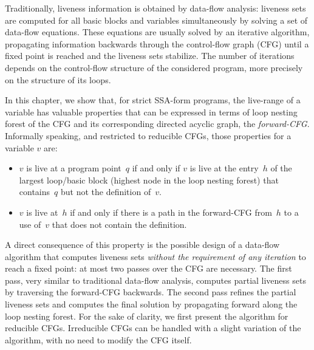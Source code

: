 
Traditionally, liveness information is obtained by data-flow analysis:
liveness sets are computed for all basic blocks and variables simultaneously by solving a set of data-flow equations.
These equations are usually solved by an iterative algorithm, propagating information backwards through the control-flow graph (CFG) until a fixed point is reached and the liveness sets stabilize.
The number of iterations depends on the control-flow structure of the considered program, more precisely on the structure of its loops.

In this chapter, we show that, for strict SSA-form programs, the live-range of a variable has valuable properties that can be expressed in terms of loop nesting forest of the CFG and its corresponding directed acyclic graph, the \emph{forward-CFG}.
Informally speaking, and restricted to reducible CFGs, those properties for a variable $v$ are:
\begin{itemize}
\item
	$v$ is live at a program point~$q$ if and only if $v$ is live at the entry~$h$ of the largest loop/basic block (highest node in the loop nesting forest) that contains~$q$ but not the definition of~$v$.
\item
	$v$ is live at~$h$ if and only if there is a path in the forward-CFG from~$h$ to a use of~$v$ that does not contain the definition.
\end{itemize}


A direct consequence of this property is the possible design of a data-flow algorithm that computes liveness sets \emph{without the requirement of any iteration} to reach a fixed point:
at most two passes over the CFG are necessary.
The first pass, very similar to traditional data-flow analysis, computes partial liveness sets by traversing the forward-CFG backwards.
The second pass refines the partial liveness sets and computes the final solution by propagating forward along the loop nesting forest.
For the sake of clarity, we first present the algorithm for reducible CFGs.
Irreducible CFGs can be handled with a slight variation of the algorithm, with no need to modify the CFG itself.

